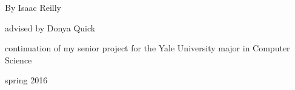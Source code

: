 \documentclass{article}
\begin{document}
\pagestyle{empty}
\begin{center}
\vspace{3cm}

\vspace{2cm}
{\Large By Isaac Reilly}

\vspace{0.15cm}
{\large advised by Donya Quick}

\vspace{0.1cm}
{continuation of my senior project for the Yale University major in Computer Science}

\vspace{13cm}

{\small spring 2016}

\end{center}

\pagebreak
\pagestyle{plain}

\end{document}
